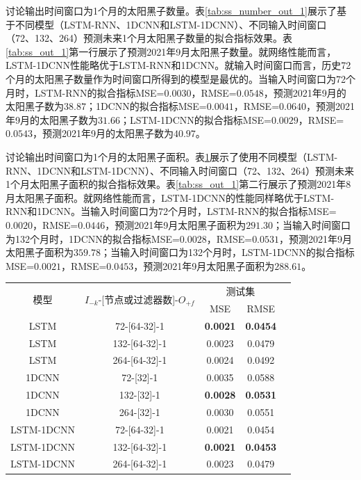 讨论输出时间窗口为1个月的太阳黑子数量。表\ref{tab:ss_number_out_1}展示了基于不同模型（LSTM-RNN、1DCNN和LSTM-1DCNN）、不同输入时间窗口（72、132、264）预测未来1个月太阳黑子数量的拟合指标效果。表\ref{tab:ss_out_1}第一行展示了预测2021年9月太阳黑子数量。就网络性能而言，LSTM-1DCNN性能略优于LSTM-RNN和1DCNN。就输入时间窗口而言，历史72个月的太阳黑子数量作为时间窗口所得到的模型是最优的。当输入时间窗口为72个月时，LSTM-RNN的拟合指标MSE=$0.0030$，RMSE=$0.0548$，预测2021年9月的太阳黑子数为$38.87$；1DCNN的拟合指标MSE=$0.0041$，RMSE=$0.0640$，预测2021年9月的太阳黑子数为$31.66$；LSTM-1DCNN的拟合指标MSE=$0.0029$，RMSE=$0.0543$，预测2021年9月的太阳黑子数为$40.97$。

讨论输出时间窗口为1个月的太阳黑子面积。表\ref{tab:ss_area_out_1}展示了使用不同模型（LSTM-RNN、1DCNN和LSTM-1DCNN）、不同输入时间窗口（72、132、264）预测未来1个月太阳黑子面积的拟合指标效果。表\ref{tab:ss_out_1}第二行展示了预测2021年8月太阳黑子面积。就网络性能而言，LSTM-1DCNN的性能同样略优于LSTM-RNN和1DCNN。当输入时间窗口为72个月时，LSTM-RNN的拟合指标MSE=$0.0020$，RMSE=$0.0446$，预测2021年9月太阳黑子面积为$291.30$；当输入时间窗口为132个月时，1DCNN的拟合指标MSE=$0.0028$，RMSE=$0.0531$，预测2021年9月太阳黑子面积为$359.78$；当输入时间窗口为132个月时，LSTM-1DCNN的拟合指标MSE=$0.0021$，RMSE=$0.0453$，预测2021年9月太阳黑子面积为$288.61$。

\begin{table}[!htbp]
  \centering
  \label{tab:ss_area_out_1}
  \footnotesize
  \renewcommand{\arraystretch}{1}
  \begin{tabular}{ccccc}
    \toprule
    \multirow{2}{*}{模型} & \multirow{2}{*}{$I_{-k}$-[节点或过滤器数]-$O_{+f}$} & \multicolumn{2}{c}{测试集}\\
    \cmidrule(lr){3-4}
    \noalign{\smallskip}
    & & MSE & RMSE\\
    \midrule 
    LSTM & 72-[64-32]-1 & \textbf{0.0021} & \textbf{0.0454} \\
    LSTM & 132-[64-32]-1 & 0.0023 & 0.0479 \\
    LSTM & 264-[64-32]-1 & 0.0024 & 0.0492 \\
    \hline
    1DCNN & 72-[32]-1 & 0.0035 & 0.0588 \\
    1DCNN & 132-[32]-1 & \textbf{0.0028} & \textbf{0.0531} \\
    1DCNN & 264-[32]-1 & 0.0030 & 0.0551 \\
    \hline
    LSTM-1DCNN & 72-[64-32]-1 & 0.0021 & 0.0454 \\
    LSTM-1DCNN & 132-[64-32]-1 & \textbf{0.0021} & \textbf{0.0453} \\
    LSTM-1DCNN & 264-[64-32]-1 & 0.0023 & 0.0479 \\
    \bottomrule
\end{tabular}
\end{table}


